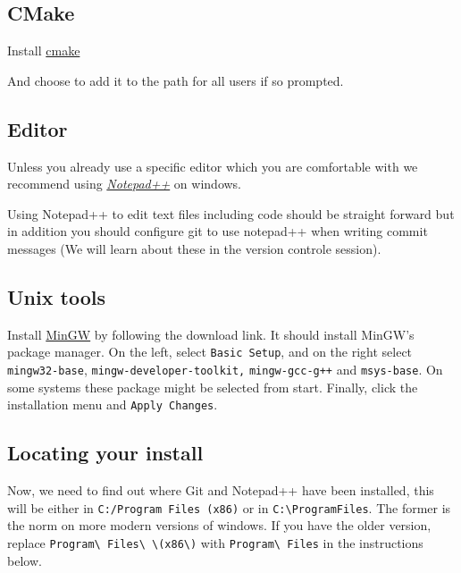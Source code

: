 \subsection{CMake}\label{cmake-2}

Install \href{http://www.cmake.org/cmake/resources/software.html}{cmake}

And choose to add it to the path for all users if so prompted.

\subsection{Editor}\label{editor}

Unless you already use a specific editor which you are comfortable with
we recommend using
\href{http://notepad-plus-plus.org/}{\emph{Notepad++}} on windows.

Using Notepad++ to edit text files including code should be straight
forward but in addition you should configure git to use notepad++ when
writing commit messages (We will learn about these in the version
controle session).

\subsection{Unix tools}\label{unix-tools}

Install \href{http://sourceforge.net/projects/mingw/}{MinGW} by
following the download link. It should install MinGW's package manager.
On the left, select \texttt{Basic Setup}, and on the right select
\texttt{mingw32-base}, \texttt{mingw-developer-toolkit,}
\texttt{mingw-gcc-g++} and \texttt{msys-base}. On some systems these
package might be selected from start. Finally, click the installation
menu and \texttt{Apply Changes}.

\subsection{Locating your install}\label{locating-your-install}

Now, we need to find out where Git and Notepad++ have been installed,
this will be either in \texttt{C:/Program Files (x86)} or in
\texttt{C:\textbackslash{}ProgramFiles}. The former is the norm on more
modern versions of windows. If you have the older version, replace
\texttt{Program\textbackslash{} Files\textbackslash{} \textbackslash{}(x86\textbackslash{})}
with \texttt{Program\textbackslash{} Files} in the instructions below.

